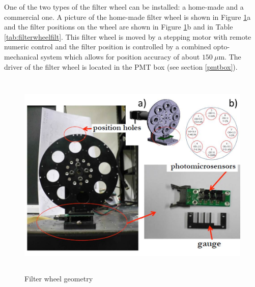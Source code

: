 One of the two types of the filter wheel can be installed: a home-made and a commercial \cite{ref:filterwheel} one. A picture of the home-made filter wheel is shown in Figure \ref{fig:x.3}a and the filter
positions on the wheel are shown in Figure \ref{fig:x.3}b and in Table \ref{tab:filterwheelfilt}. This filter wheel is
moved by a stepping motor with remote numeric control and the filter position is
controlled by a combined opto-mechanical system which allows for 
position accuracy of about  $150 ~\mu$m. The driver of the filter wheel is located
in the PMT box (see section \ref{pmtbox}).
% 
\begin{figure}[htb]
\begin{center} 
\includegraphics[height=10cm]{figures/Filter_wheel}
\caption{Filter wheel geometry
}\label{fig:x.3}
\end{center}
\end{figure}
%


